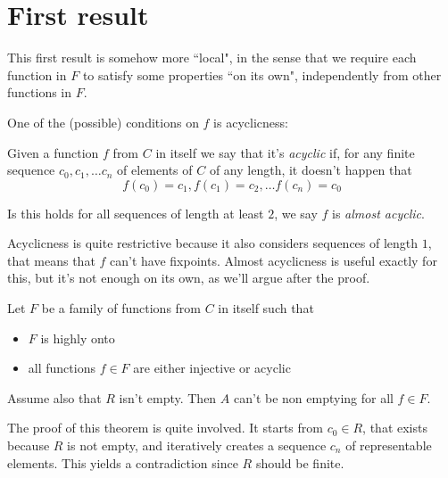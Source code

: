 \section{First result}
This first result is somehow more ``local", in the sense that we require each function in $F$ to satisfy some properties ``on its own", independently from other functions in $F$.

One of the (possible) conditions on $f$ is acyclicness:
\begin{definition}
	Given a function $f$ from $C$ in itself we say that it's \textit{acyclic} if, for any finite sequence $c_0, c_1, \dots c_n$ of elements of $C$ of any length, it doesn't happen that
	\[
	f(c_0) = c_1, f(c_1) = c_2, \dots f(c_n) = c_0
	\]
	
	Is this holds for all sequences of length at least $2$, we say $f$ is \textit{almost acyclic}.
\end{definition}
Acyclicness is quite restrictive because it also considers sequences of length $1$, that means that $f$ can't have fixpoints. Almost acyclicness is useful exactly for this, but it's not enough on its own, as we'll argue after the proof.

\begin{theorem}\label{ch4:th:non-empt-res-local}
	Let $F$ be a family of functions from $C$ in itself such that
	\begin{itemize}
		\item $F$ is highly onto
		\item all functions $f \in F$ are either injective or acyclic
	\end{itemize}
	Assume also that $R$ isn't empty. Then $A$ can't be non emptying for all $f \in F$.
\end{theorem}
The proof of this theorem is quite involved. It starts from $c_0 \in R$, that exists because $R$ is not empty, and iteratively creates a sequence $c_n$ of representable elements. This yields a contradiction since $R$ should be finite.

